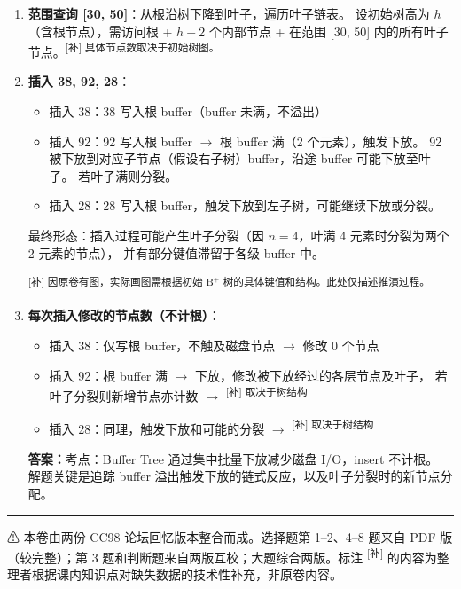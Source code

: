 \documentclass[11pt,a4paper]{article}
\newcommand{\answer}{\par\noindent\textcolor{ansred}{\textbf{答案：}}}
\newcommand{\supp}[1]{\textcolor{ansred}{\textsuperscript{[补] #1}}}
\begin{document}
\begin{enumerate}[label=(\arabic*),leftmargin=*]

  \item \textbf{范围查询 [30, 50]}：从根沿树下降到叶子，遍历叶子链表。
  设初始树高为 $h$（含根节点），需访问根 + $h-2$ 个内部节点 +
  在范围 [30, 50] 内的所有叶子节点。\supp{具体节点数取决于初始树图。}

  \item \textbf{插入 38, 92, 28}：

  \begin{itemize}[nosep]
    \item 插入 38：38 写入根 buffer（buffer 未满，不溢出）\\
    \item 插入 92：92 写入根 buffer $\to$ 根 buffer 满（2 个元素），触发下放。
    92 被下放到对应子节点（假设右子树）buffer，沿途 buffer 可能下放至叶子。
    若叶子满则分裂。
    \item 插入 28：28 写入根 buffer，触发下放到左子树，可能继续下放或分裂。
  \end{itemize}

  最终形态：插入过程可能产生叶子分裂（因 $n=4$，叶满 4 元素时分裂为两个 2-元素的节点），
  并有部分键值滞留于各级 buffer 中。

  \supp{因原卷有图，实际画图需根据初始 B$^+$ 树的具体键值和结构。此处仅描述推演过程。}

  \item \textbf{每次插入修改的节点数（不计根）}：

  \begin{itemize}[nosep]
    \item 插入 38：仅写根 buffer，不触及磁盘节点 $\to$ 修改 0 个节点
    \item 插入 92：根 buffer 满 $\to$ 下放，修改被下放经过的各层节点及叶子，
          若叶子分裂则新增节点亦计数 $\to$ \supp{取决于树结构}
    \item 插入 28：同理，触发下放和可能的分裂 $\to$ \supp{取决于树结构}
  \end{itemize}

  \answer 考点：Buffer Tree 通过集中批量下放减少磁盘 I/O，insert 不计根。
  解题关键是追踪 buffer 溢出触发下放的链式反应，以及叶子分裂时的新节点分配。

\end{enumerate}

\vfill
\hrule
\vspace{4pt}
{\footnotesize \textcolor{ansred}{⚠ 本卷由两份 CC98 论坛回忆版本整合而成。选择题第 1--2、4--8 题来自 PDF 版（较完整）；第 3 题和判断题来自两版互校；大题综合两版。标注 \textsuperscript{[补]} 的内容为整理者根据课内知识点对缺失数据的技术性补充，非原卷内容。}}
\end{document}
